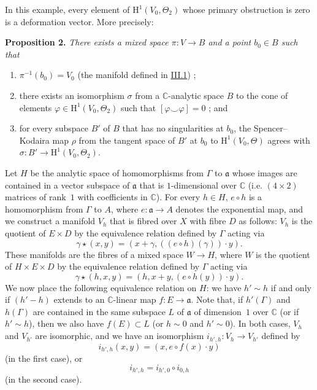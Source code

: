 \documentclass{article}
\newenvironment{itenv}[1]
  {\phantomsection\par\medskip\noindent\textbf{#1.}\itshape}
  {\medskip}
\newcommand{\fk}[1]{{\mathfrak{#1}}}
\newcommand{\CC}{\mathbb{C}}
\newcommand{\HH}{\mathrm{H}}
\newcommand{\oldpage}[1]{\marginpar{\footnotesize$\Big\vert$ \textit{p.~#1}}}
\begin{document}
In this example, every element of $\HH^1(V_0,\Theta_2)$ whose primary obstruction is zero is a deformation vector.
More precisely:

\oldpage{2-07}
\begin{itenv}{Proposition 2}
\label{proposition2}
  There exists a mixed space $\pi\colon V\to B$ and a point $b_0\in B$ such that
  \begin{enumerate}
    \item $\pi^{-1}(b_0)=V_0$ (the manifold defined in \hyperref[III.1]{III.1}) ;
    \item there exists an isomorphism $\sigma$ from a $\CC$-analytic space $B$ to the cone of elements $\varphi\in\HH^1(V_0,\Theta_2)$ such that $[\varphi\smile\varphi]=0$ ; and
    \item for every subspace $B'$ of $B$ that has no singularities at $b_0$, the Spencer--Kodaira map $\rho$ from the tangent space of $B'$ at $b_0$ to $\HH^1(V_0,\Theta)$ agrees with $\sigma\colon B'\to\HH^1(V_0,\Theta_2)$.
  \end{enumerate}
\end{itenv}

Let $H$ be the analytic space of homomorphisms from $\Gamma$ to $\fk{a}$ whose images are contained in a vector subspace of $\fk{a}$ that is $1$-dimensional over $\CC$ (i.e. $(4\times2)$ matrices of rank~$1$ with coefficients in $\CC$).
For every $h\in H$, $e\circ h$ is a homomorphism from $\Gamma$ to $A$, where $e\colon\fk{a}\to A$ denotes the exponential map, and we construct a manifold $V_h$ that is fibred over $X$ with fibre $D$ as follows: $V_h$ is the quotient of $E\times D$ by the equivalence relation defined by $\Gamma$ acting via
\[
  \gamma\star(x,y) = (x+\gamma,((e\circ h)(\gamma))\cdot y).
\]
These manifolds are the fibres of a mixed space $W\to H$, where $W$ is the quotient of $H\times E\times D$ by the equivalence relation defined by $\Gamma$ acting via
\[
  \gamma\star(h,x,y) = (h,x+y,(e\circ h(y))\cdot y).
\]
We now place the following equivalence relation on $H$: we have $h'\sim h$ if and only if $(h'-h)$ extends to an $\CC$-linear map $f\colon E\to\fk{a}$.
Note that, if $h'(\Gamma)$ and $h(\Gamma)$ are contained in the same subspace $L$ of $\fk{a}$ of dimension~$1$ over $\CC$ (or if $h'\sim h$), then we also have $f(E)\subset L$ (or $h\sim0$ and $h'\sim0$).
In both cases, $V_h$ and $V_{h'}$ are isomorphic, and we have an isomorphism $i_{h',h}\colon V_h\to V_{h'}$ defined by
\[
  i_{h',h}(x,y) = (x,e\circ f(x)\cdot y)
\]
(in the first case), or
\[
  i_{h',h} = i_{h',0}\circ i_{0,h}
\]
(in the second case).
\oldpage{4-08}
\end{document}
